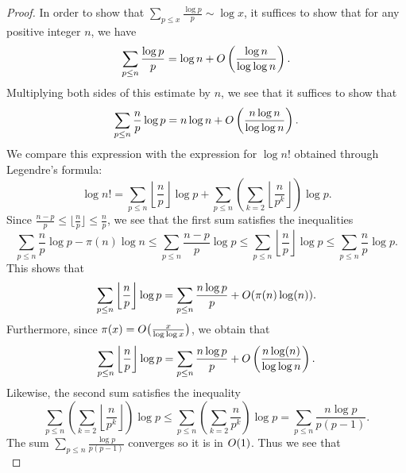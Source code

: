 \begin{proof}
  In order to show that $\sum_{p\leq x}\frac{\log p}{p}\sim \log x$, it suffices to show that for any positive integer $n$, we have
  \begin{equation*}
    \sum_{p\leq n}\frac{\log p}{p}=\log n + O\left(\frac{\log n}{\log\log n}\right).
  \end{equation*}
  Multiplying both sides of this estimate by $n$, we see that it suffices to show that
  \begin{equation*}
    \sum_{p\leq n}\frac{n}{p} \log p=n\log n + O\left(\frac{n\log n}{\log\log n}\right).
  \end{equation*}
  We compare this expression with the expression for $\log n!$ obtained through Legendre's formula:
  \begin{equation*}
    \log n! = \sum_{p\leq n}\left\lfloor\frac{n}{p}\right\rfloor\log p + \sum_{p\leq n}\left(\sum_{k=2}\left\lfloor\frac{n}{p^k}\right\rfloor\right)\log p.
  \end{equation*}
  Since $\frac{n-p}{p}\leq \lfloor\frac{n}{p}\rfloor\leq \frac{n}{p}$, we see that the first sum satisfies the inequalities
  \begin{equation*}
    \sum_{p\leq n}\frac{n}{p}\log p - \pi(n)\log n \leq \sum_{p\leq n}\frac{n-p}{p}\log p \leq \sum_{p\leq n}\left\lfloor\frac{n}{p}\right\rfloor\log p \leq \sum_{p\leq n}\frac{n}{p}\log p.
  \end{equation*}
  This shows that
  \begin{equation*}
    \sum_{p\leq n}\left\lfloor\frac{n}{p}\right\rfloor\log p = \sum_{p\leq n}\frac{n\log p}{p} + O(\pi(n)\log(n)).
  \end{equation*}
  Furthermore, since $\pi(x)=O\bigl(\frac{x}{\log\log x}\bigr)$, we obtain that
  \begin{equation*}
    \sum_{p\leq n}\left\lfloor\frac{n}{p}\right\rfloor\log p = \sum_{p\leq n}\frac{n\log p}{p} + O\left(\frac{n\log(n)}{\log\log n}\right).
  \end{equation*}
  Likewise, the second sum satisfies the inequality
  \begin{equation*}
    \sum_{p\leq n}\left(\sum_{k=2}\left\lfloor\frac{n}{p^k}\right\rfloor\right)\log p \leq \sum_{p\leq n}\left(\sum_{k=2}\frac{n}{p^k}\right)\log p=\sum_{p\leq n}\frac{n\log p}{p(p-1)}.
  \end{equation*}
  The sum $\sum_{p\leq n}\frac{\log p}{p(p-1)}$ converges so it is in $O(1)$. Thus we see that
  \begin{equation*}

\end{equation*}
\end{proof}
